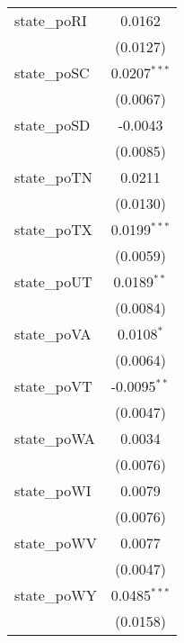 \begin{tabular}{lc}
   state\_poRI                                        & 0.0162\\   
                                                      & (0.0127)\\   
   state\_poSC                                        & 0.0207$^{***}$\\   
                                                      & (0.0067)\\   
   state\_poSD                                        & -0.0043\\   
                                                      & (0.0085)\\   
   state\_poTN                                        & 0.0211\\   
                                                      & (0.0130)\\   
   state\_poTX                                        & 0.0199$^{***}$\\   
                                                      & (0.0059)\\   
   state\_poUT                                        & 0.0189$^{**}$\\   
                                                      & (0.0084)\\   
   state\_poVA                                        & 0.0108$^{*}$\\   
                                                      & (0.0064)\\   
   state\_poVT                                        & -0.0095$^{**}$\\   
                                                      & (0.0047)\\   
   state\_poWA                                        & 0.0034\\   
                                                      & (0.0076)\\   
   state\_poWI                                        & 0.0079\\   
                                                      & (0.0076)\\   
   state\_poWV                                        & 0.0077\\   
                                                      & (0.0047)\\   
   state\_poWY                                        & 0.0485$^{***}$\\   
                                                      & (0.0158)\\   

\end{tabular}
